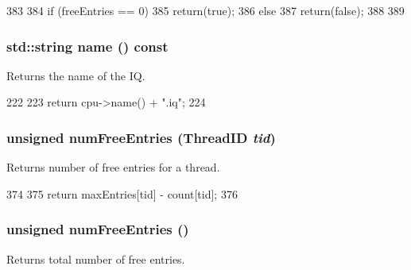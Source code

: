 \begin{DoxyCode}
383 {
384     if (freeEntries == 0) {
385         return(true);
386     } else {
387         return(false);
388     }
389 }
\end{DoxyCode}
\hypertarget{classInstQueue_a37627d5d5bba7f4a8690c71c2ab3cb07}{
\subsubsection[{name}]{\setlength{\rightskip}{0pt plus 5cm}std::string name () const}}
\label{classInstQueue_a37627d5d5bba7f4a8690c71c2ab3cb07}
Returns the name of the IQ. 


\begin{DoxyCode}
222 {
223     return cpu->name() + ".iq";
224 }
\end{DoxyCode}
\hypertarget{classInstQueue_acc878f608deead5b5319a6a3f98b50c8}{
\subsubsection[{numFreeEntries}]{\setlength{\rightskip}{0pt plus 5cm}unsigned numFreeEntries ({\bf ThreadID} {\em tid})}}
\label{classInstQueue_acc878f608deead5b5319a6a3f98b50c8}
Returns number of free entries for a thread. 


\begin{DoxyCode}
374 {
375     return maxEntries[tid] - count[tid];
376 }
\end{DoxyCode}
\hypertarget{classInstQueue_a028971a565aca048c67ea1c36a6a9d51}{
\subsubsection[{numFreeEntries}]{\setlength{\rightskip}{0pt plus 5cm}unsigned numFreeEntries ()}}
\label{classInstQueue_a028971a565aca048c67ea1c36a6a9d51}
Returns total number of free entries. 



